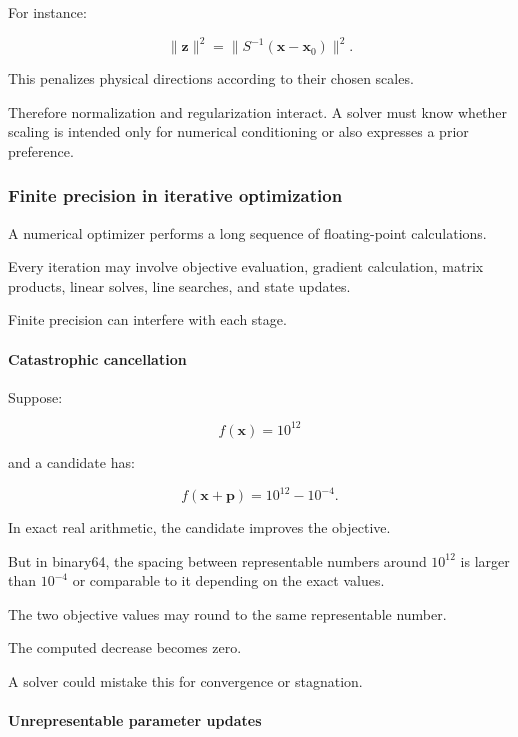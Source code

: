 For instance:

\[
\|\mathbf z\|^2 = \|S^{-1}(\mathbf x-\mathbf x_0)\|^2.
\]

This penalizes physical directions according to their chosen scales.

Therefore normalization and regularization interact. A solver must know whether scaling is intended only for numerical conditioning or also expresses a prior preference.

\subsubsection{Finite precision in iterative optimization}\label{02-foundations-ii-ch027-finite-precision-in-iterative-optimization}

A numerical optimizer performs a long sequence of floating-point calculations.

Every iteration may involve objective evaluation, gradient calculation, matrix products, linear solves, line searches, and state updates.

Finite precision can interfere with each stage.

\paragraph{Catastrophic cancellation}\label{02-foundations-ii-ch027-catastrophic-cancellation}

Suppose:

\[
f(\mathbf x)=10^{12}
\]

and a candidate has:

\[
f(\mathbf x+\mathbf p)=10^{12}-10^{-4}.
\]

In exact real arithmetic, the candidate improves the objective.

But in binary64, the spacing between representable numbers around \(10^{12}\) is larger than \(10^{-4}\) or comparable to it depending on the exact values.

The two objective values may round to the same representable number.

The computed decrease becomes zero.

A solver could mistake this for convergence or stagnation.

\paragraph{Unrepresentable parameter updates}\label{02-foundations-ii-ch027-unrepresentable-parameter-updates}

